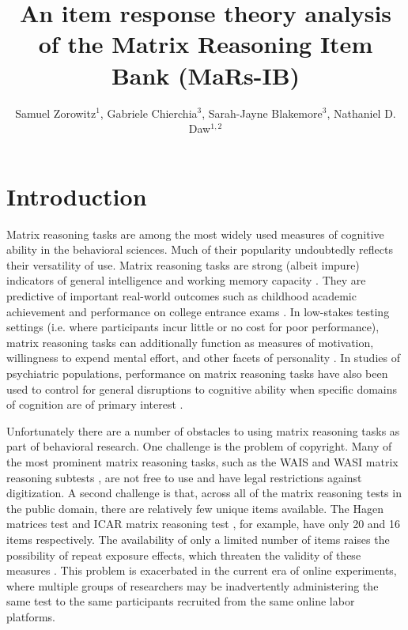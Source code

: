 \documentclass[a4paper,man,natbib]{apa6}
\title{An item response theory analysis of the Matrix Reasoning Item Bank (MaRs-IB)}
\author{Samuel Zorowitz$^1$, Gabriele Chierchia$^3$, Sarah-Jayne Blakemore$^3$, Nathaniel D. Daw$^{1,2}$}
\affiliation{$^1$Princeton Neuroscience Institute, Princeton University, USA\\$^2$Department of Psychology, Princeton University, USA\\$^3$Department of Psychology, University of Cambridge, Downing Street, Cambridge, UK}
\begin{document}
\maketitle

\section{Introduction}

Matrix reasoning tasks are among the most widely used measures of cognitive ability in the behavioral sciences. Much of their popularity undoubtedly reflects their versatility of use. Matrix reasoning tasks are strong (albeit impure) indicators of general intelligence \citep{gignac2015raven} and working memory capacity \citep{kane2004generality, unsworth2005working}. They are predictive of important real-world outcomes such as childhood academic achievement \citep{roth2015intelligence} and performance on college entrance exams \citep{frey2004scholastic, koenig2008act}. In low-stakes testing settings (i.e. where participants incur little or no cost for poor performance), matrix reasoning tasks can additionally function as measures of motivation, willingness to expend mental effort, and other facets of personality \citep{duckworth2011role, gignac2019maximum}. In studies of psychiatric populations, performance on matrix reasoning tasks have also been used to control for general disruptions to cognitive ability when specific domains of cognition are of primary interest \citep{gillan2016characterizing, rouault2018psychiatric, moutoussis2021decision}.

Unfortunately there are a number of obstacles to using matrix reasoning tasks as part of behavioral research. One challenge is the problem of copyright. Many of the most prominent matrix reasoning tasks, such as the WAIS and WASI matrix reasoning subtests \citep{wechsler1999wechsler, corporation2008wechsler}, are not free to use and have legal restrictions against digitization. A second challenge is that, across all of the matrix reasoning tests in the public domain, there are relatively few unique items available. The Hagen matrices test \citep{heydasch2014hagen} and ICAR matrix reasoning test \citep{condon2014international}, for example, have only 20 and 16 items respectively. The availability of only a limited number of items raises the possibility of repeat exposure effects, which threaten the validity of these measures  \citep{ng1974applicability, bors2003effect}. This problem is exacerbated in the current era of online experiments, where multiple groups of researchers may be inadvertently administering the same test to the same participants recruited from the same online labor platforms.
\end{document}
